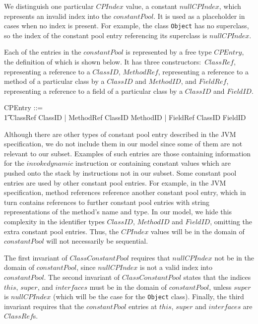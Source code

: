 We distinguish one particular $CPIndex$ value, a constant
$nullCPIndex$, which represents an invalid index into the
$constantPool$.
It is used as a placeholder in cases when no index is present.
For example, the class \texttt{Object} has no superclass, so the index
of the constant pool entry referencing its superclass is
$nullCPIndex$.

Each of the entries in the $constantPool$ is represented by a free
type $CPEntry$, the definition of which is shown below.
It has three constructors:~$ClassRef$, representing a reference to a
$ClassID$, $MethodRef$, representing a reference to a method of a
particular class by a $ClassID$ and $MethodID$, and $FieldRef$,
representing a reference to a field of a particular class by a
$ClassID$ and $FieldID$.
\begin{zed}
  CPEntry ::= \\
  \t1 ClassRef \ldata ClassID \rdata | MethodRef \ldata
  ClassID \cross MethodID \rdata | FieldRef \ldata ClassID \cross
  FieldID \rdata
\end{zed}
Although there are other types of constant pool entry described in the
JVM specification, we do not include them in our model since some of
them are not relevant to our subset. 
Examples of such entries are those containing information for the
$invokedynamic$ instruction or containing constant values which are
pushed onto the stack by instructions not in our subset.
Some constant pool entries are used by other constant pool entries.
For example, in the JVM specification, method references reference
another constant pool entry, which in turn contains references to
further constant pool entries with string representations of the
method's name and type.
In our model, we hide this complexity in the identifier types
$ClassID$, $MethodID$ and $FieldID$, omitting the extra constant pool
entries.
Thus, the $CPIndex$ values will be in the domain of $constantPool$
will not necessarily be sequential.

The first invariant of $ClassConstantPool$ requires that $nullCPIndex$
not be in the domain of $constantPool$, since $nullCPIndex$ is not a
valid index into $constantPool$.
The second invariant of $ClassConstantPool$ states that the indices
$this$, $super$, and $interfaces$ must be in the domain of
$constantPool$, unless $super$ is $nullCPIndex$ (which will be the
case for the \texttt{Object} class).
Finally, the third invariant requires that the $constantPool$ entries
at $this$, $super$ and $interfaces$ are $ClassRef$s.

